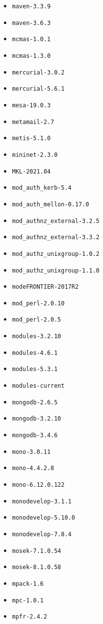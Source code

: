 \begin{multicols}{3}
\begin{itemize}
\item \verb|maven-3.3.9|
\item \verb|maven-3.6.3|
\item \verb|mcmas-1.0.1|
\item \verb|mcmas-1.3.0|
\item \verb|mercurial-3.0.2|
\item \verb|mercurial-5.6.1|
\item \verb|mesa-19.0.3|
\item \verb|metamail-2.7|
\item \verb|metis-5.1.0|
\item \verb|mininet-2.3.0|
\item \verb|MKL-2021.04|
\item \verb|mod_auth_kerb-5.4|
\item \verb|mod_auth_mellon-0.17.0|
\item \verb|mod_authnz_external-3.2.5|
\item \verb|mod_authnz_external-3.3.2|
\item \verb|mod_authz_unixgroup-1.0.2|
\item \verb|mod_authz_unixgroup-1.1.0|
\item \verb|modeFRONTIER-2017R2|
\item \verb|mod_perl-2.0.10|
\item \verb|mod_perl-2.0.5|
\item \verb|modules-3.2.10|
\item \verb|modules-4.6.1|
\item \verb|modules-5.3.1|
\item \verb|modules-current|
\item \verb|mongodb-2.6.5|
\item \verb|mongodb-3.2.10|
\item \verb|mongodb-3.4.6|
\item \verb|mono-3.0.11|
\item \verb|mono-4.4.2.8|
\item \verb|mono-6.12.0.122|
\item \verb|monodevelop-3.1.1|
\item \verb|monodevelop-5.10.0|
\item \verb|monodevelop-7.8.4|
\item \verb|mosek-7.1.0.54|
\item \verb|mosek-8.1.0.58|
\item \verb|mpack-1.6|
\item \verb|mpc-1.0.1|
\item \verb|mpfr-2.4.2|

\end{itemize}
\end{multicols}
